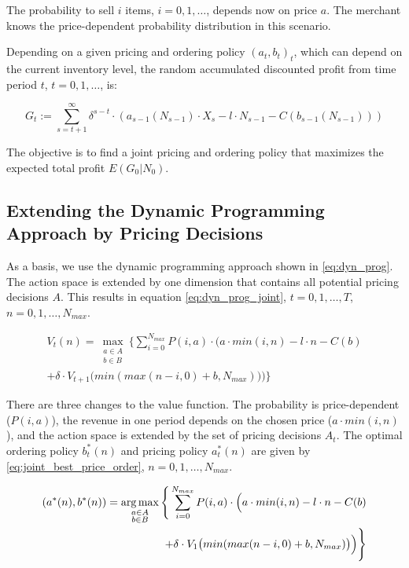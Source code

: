 The probability to sell $i$ items, $i=0,1,\ldots$, depends now on price $a$.
The merchant knows the price-dependent probability distribution in this scenario.

Depending on a given pricing and ordering policy $(a_t, b_t)_t$, which can depend on the current inventory level, the random accumulated discounted profit from time period $t$, $t=0,1,\ldots$, is:

$$
G_t := \sum_{s=t+1}^{\infty} \delta^{s-t} \cdot (a_{s-1}(N_{s-1}) \cdot X_s - l \cdot N_{s-1} - C(b_{s-1}(N_{s-1})))
$$

The objective is to find a joint pricing and ordering policy that maximizes the expected total profit $E(G_0 | N_0)$.

\subsection{Extending the Dynamic Programming Approach by Pricing Decisions}
\label{section:joint_solution}
As a basis, we use the dynamic programming approach shown in \cref{eq:dyn_prog}.
The action space is extended by one dimension that contains all potential pricing decisions $A$.
This results in equation \cref{eq:dyn_prog_joint}, $t=0, 1, \ldots,T$, $n = 0,1,\ldots,N_{max}$.

\begin{equation}
\begin{split}
V_t(n) = \max_{\substack{a \in A \\ b \in B}} \Bigg\{
\sum_{i = 0}^{N_{max}}
P(i, a) \cdot \Big(
a \cdot min(i, n) %
- l \cdot n %
- C(b) %
 \\
+ \delta \cdot V_{t+1}\big(min(max(n - i, 0) + b, N_{max})\big)
\Big)\Bigg\}
\end{split}
\label{eq:dyn_prog_joint}
\end{equation}

There are three changes to the value function.
The probability is price-dependent ($P(i, a)$), the revenue in one period depends on the chosen price ($a \cdot min(i, n)$), and the action space is extended by the set of pricing decisions $A_t$.
The optimal ordering policy $b^*_t(n)$ and pricing policy $a^*_t(n)$ are given by \cref{eq:joint_best_price_order}, $n=0,1,\ldots,N_{max}$.

\begin{equation}
\begin{split}
(a^*(n), b^*(n)) = \argmax_{\substack{a \in A \\ b \in B}} \Bigg\{
\sum_{i = 0}^{N_{max}}
P(i, a) \cdot \Big(
a \cdot min(i, n) %
- l \cdot n %
- C(b) %
 \\
+ \delta \cdot V_{1}\big(min(max(n - i, 0) + b, N_{max})\big)
\Big)\Bigg\}
\end{split}
\label{eq:joint_best_price_order}
\end{equation}

